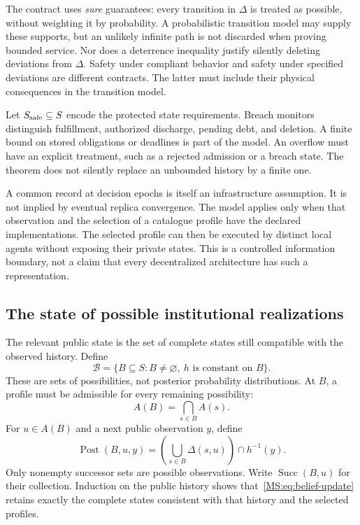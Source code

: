 The contract uses \emph{sure} guarantees: every transition in $\Delta$ is treated as possible, without weighting it by probability. A probabilistic transition model may supply these supports, but an unlikely infinite path is not discarded when proving bounded service. Nor does a deterrence inequality justify silently deleting deviations from $\Delta$. Safety under compliant behavior and safety under specified deviations are different contracts. The latter must include their physical consequences in the transition model.

Let $S_{\rm safe}\subseteq S$ encode the protected state requirements. Breach monitors distinguish fulfillment, authorized discharge, pending debt, and deletion. A finite bound on stored obligations or deadlines is part of the model. An overflow must have an explicit treatment, such as a rejected admission or a breach state. The theorem does not silently replace an unbounded history by a finite one.

A common record at decision epochs is itself an infrastructure assumption. It is not implied by eventual replica convergence. The model applies only when that observation and the selection of a catalogue profile have the declared implementations. The selected profile can then be executed by distinct local agents without exposing their private states. This is a controlled information boundary, not a claim that every decentralized architecture has such a representation.

\subsection{The state of possible institutional realizations}
The relevant public state is the set of complete states still compatible with the observed history. Define
\[
\mathcal B=\{B\subseteq S:B\ne\varnothing,\ h\text{ is constant on }B\}.
\]
These are sets of possibilities, not posterior probability distributions. At $B$, a profile must be admissible for every remaining possibility:
\[
A(B)=\bigcap_{s\in B}A(s).
\]
For $u\in A(B)$ and a next public observation $y$, define
\begin{equation}\label{MS:eq:belief-update}
\operatorname{Post}(B,u,y)=
\left(\bigcup_{s\in B}\Delta(s,u)\right)\cap h^{-1}(y).
\end{equation}
Only nonempty successor sets are possible observations. Write $\operatorname{Succ}(B,u)$ for their collection. Induction on the public history shows that~\eqref{MS:eq:belief-update} retains exactly the complete states consistent with that history and the selected profiles.

